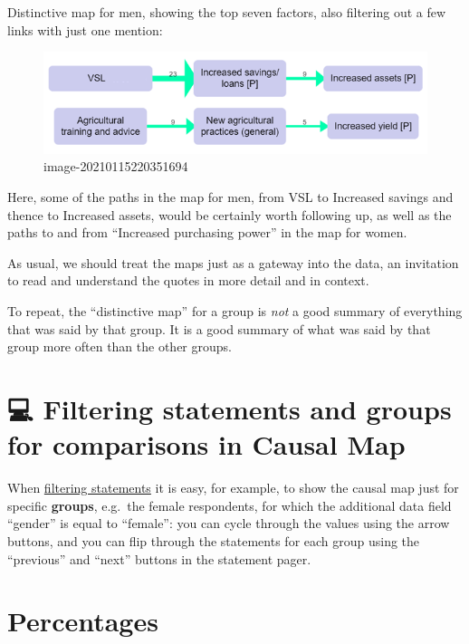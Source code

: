 \documentclass[
]{book}
\begin{document}
Distinctive map for men, showing the top seven factors, also filtering out a few links with just one mention:

\begin{figure}
\centering
\includegraphics{_assets/image-20210115220351694.png}
\caption{image-20210115220351694}
\end{figure}

Here, some of the paths in the map for men, from VSL to Increased savings and thence to Increased assets, would be certainly worth following up, as well as the paths to and from ``Increased purchasing power'' in the map for women.

As usual, we should treat the maps just as a gateway into the data, an invitation to read and understand the quotes in more detail and in context.

To repeat, the ``distinctive map'' for a group is \emph{not} a good summary of everything that was said by that group. It is a good summary of what was said by that group more often than the other groups.

\hypertarget{filtering-statements-and-groups-for-comparisons-in-causal-map}{%
\section{💻 Filtering statements and groups for comparisons in Causal Map}\label{filtering-statements-and-groups-for-comparisons-in-causal-map}}

When \protect\hyperlink{filtering-the-map-by-statement-source-question}{filtering statements} it is easy, for example, to show the causal map just for specific \textbf{groups}, e.g.~the female respondents, for which the additional data field ``gender'' is equal to ``female'': you can cycle through the values using the arrow buttons, and you can flip through the statements for each group using the ``previous'' and ``next'' buttons in the statement pager.

\hypertarget{percent}{%
\section{Percentages}\label{percent}}
\end{document}
